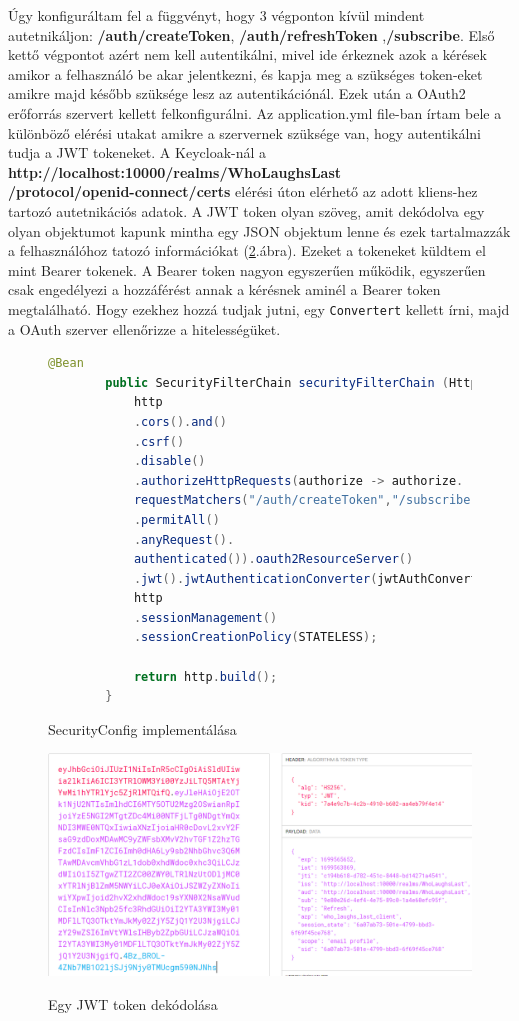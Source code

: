 \documentclass[a4paper,twoside]{article}
\begin{document}
Úgy konfiguráltam fel a függvényt, hogy 3 végponton kívül mindent autetnikáljon: \textbf{/auth/createToken}, \textbf{/auth/refreshToken} ,\textbf{/subscribe}. Első kettő végpontot azért nem kell autentikálni, mivel ide érkeznek azok a kérések amikor a felhasználó be akar jelentkezni, és kapja meg a szükséges token-eket amikre majd később szüksége lesz az autentikációnál. Ezek után a OAuth2 erőforrás szervert kellett felkonfigurálni. Az application.yml file-ban írtam bele a különböző elérési utakat amikre a szervernek szüksége van, hogy autentikálni tudja a JWT tokeneket. A Keycloak-nál a \textbf{http://localhost:10000/realms/WhoLaughsLast\\/protocol/openid-connect/certs} elérési úton 
elérhető az adott kliens-hez tartozó autetnikációs adatok. A JWT token olyan szöveg, amit dekódolva egy olyan objektumot kapunk mintha egy JSON objektum lenne és ezek tartalmazzák a felhasználóhoz tatozó információkat (\ref{jwt}.ábra). Ezeket a tokeneket küldtem el mint Bearer tokenek. A Bearer token nagyon egyszerűen működik, egyszerűen csak engedélyezi a hozzáférést annak a kérésnek aminél a Bearer token megtalálható. Hogy ezekhez hozzá tudjak jutni,
egy \verb|Convertert| kellett írni, majd a OAuth szerver ellenőrizze a hitelességüket. 

\begin{figure}
	\caption{SecurityConfig implementálása}
	
	\begin{lstlisting}[language=java,breaklines=true]
		@Bean
		public SecurityFilterChain securityFilterChain (HttpSecurity http) throws Exception{
			http
			.cors().and()
			.csrf()
			.disable()
			.authorizeHttpRequests(authorize -> authorize.
			requestMatchers("/auth/createToken","/subscribe","/auth/refreshToken")
			.permitAll()
			.anyRequest().
			authenticated()).oauth2ResourceServer()
			.jwt().jwtAuthenticationConverter(jwtAuthConverter);
			http
			.sessionManagement()
			.sessionCreationPolicy(STATELESS);
			
			return http.build();
		}
	\end{lstlisting}
	\label{secConf}
\end{figure}





\begin{figure}
	\caption{Egy JWT token dekódolása}
	\centering
	\includegraphics[scale=0.35]{jwt}
	\label{jwt}
\end{figure}
\FloatBarrier
\end{document}
